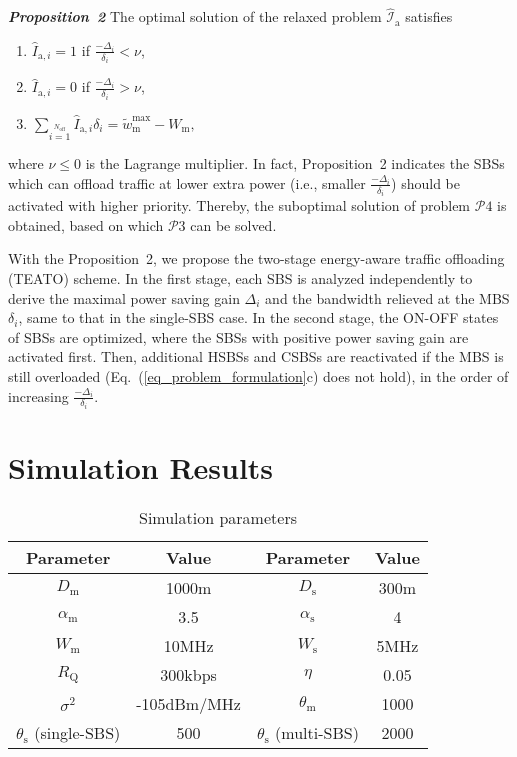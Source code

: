 \documentclass[12pt, draftclsnofoot,onecolumn]{IEEEtran}
\begin{document}
\emph{\textbf{Proposition~2}} The optimal solution of the relaxed problem $\hat{\mathcal{I}}_{\mathrm{a}}$ satisfies
\begin{enumerate}
  \item $\hat{I}_{\mathrm{a},i} = 1$ if $\frac{-\Delta_{i}}{\delta_{i}} < \nu$,
  \item $\hat{I}_{\mathrm{a},i} = 0$ if $\frac{-\Delta_{i}}{\delta_{i}} > \nu$,
  \item $\sum\limits_{i=1}\limits^{N_\mathrm{off}} \hat{I}_{\mathrm{a},i} \delta_{i} = \tilde{w}_\mathrm{m}^{\max}  - W_\mathrm{m},$
\end{enumerate}
where $\nu \leq 0$ is the Lagrange multiplier.
In fact, Proposition~2 indicates the SBSs which can offload traffic at lower extra power (i.e., smaller $\frac{-\Delta_{i}}{\delta_{i}}$) should be activated with higher priority.
Thereby, the suboptimal solution of problem $\mathcal{P}4$ is obtained, based on which $\mathcal{P}3$ can be solved.

With the Proposition~2, we propose the two-stage energy-aware traffic offloading (TEATO) scheme.
In the first stage, each SBS is analyzed independently to derive the maximal power saving gain $\Delta_i$ and the bandwidth relieved at the MBS $\delta_{i}$, same to that in the single-SBS case.
In the second stage, the ON-OFF states of SBSs are optimized, where the SBSs with positive power saving gain are activated first.
Then, additional HSBSs and CSBSs are reactivated if the MBS is still overloaded (Eq.~(\ref{eq_problem_formulation}c) does not hold), in the order of increasing $\frac{-\Delta_{i}}{\delta_{i}}$. \section{Simulation Results}
    \label{sec_numerical_results}
    \begin{table}[!t]
        \caption{Simulation parameters}
        \label{tab_parameter}
        \centering
        \begin{tabular}{cc||cc}
        \hline
        \hline
        Parameter & Value & Parameter & Value \\
        \hline
        $D_\mathrm{m}$ & 1000m & $D_\mathrm{s}$ & 300m \\
        $\alpha_\mathrm{m}$ & 3.5 & $\alpha_\mathrm{s}$ & 4 \\
        $W_\mathrm{m}$ & 10MHz & $W_\mathrm{s}$ & 5MHz\\
        $R_\mathrm{Q}$ & 300kbps & $\eta$ & 0.05\\
        $\sigma^2$ & -105dBm/MHz & $\theta_\mathrm{m}$ & 1000\\
        $\theta_\mathrm{s}$ (single-SBS) & 500 & $\theta_\mathrm{s}$ (multi-SBS) & 2000\\
        \hline
        \hline
        \end{tabular}
\end{table}
\end{document}
